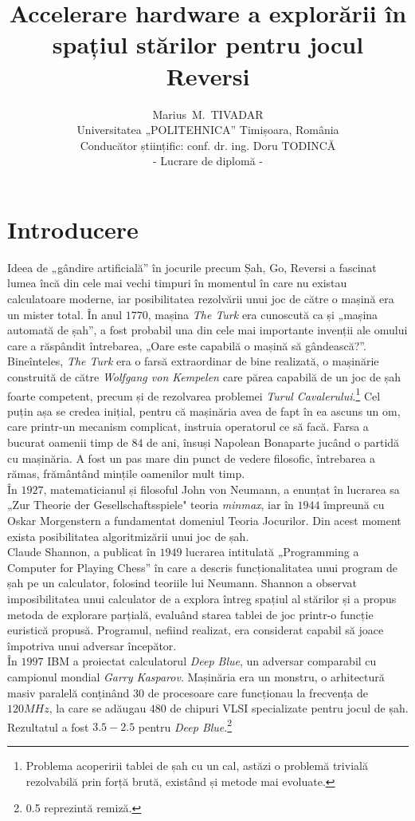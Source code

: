 \documentclass[11pt,twocolumn,a4paper]{article}
\title{\huge{Accelerare hardware a explorării în spațiul stărilor pentru jocul Reversi}}
\author{
Marius~M.~TIVADAR\\
Universitatea „POLITEHNICA” Timișoara, România\\
Conducător științific: conf. dr. ing. Doru TODINCĂ\\
- Lucrare de diplomă -
}
\begin{document}
\renewcommand{\today}{5 iunie 2009}
\maketitle

\section*{Introducere}
Ideea de „gândire artificială” în jocurile precum Șah, Go, Reversi a fascinat lumea încă din cele mai vechi timpuri în momentul în care nu existau calculatoare moderne, iar posibilitatea rezolvării unui joc de către o mașină era un mister total. În anul $1770$, mașina \emph{The Turk} era cunoscută ca și „mașina automată de șah”, a fost probabil una din cele mai importante invenții ale omului care a răspândit întrebarea, „Oare este capabilă o mașină să gândească?”. Bineînteles, \emph{The Turk} era o farsă extraordinar de bine realizată, o mașinărie construită de către \emph{Wolfgang von Kempelen} care părea capabilă de un joc de șah foarte competent, precum și de rezolvarea problemei \emph{Turul Cavalerului}.\footnote{Problema acoperirii tablei de șah cu un cal, astăzi o problemă trivială rezolvabilă prin forță brută, existând și metode mai evoluate.} Cel puțin așa se credea inițial, pentru că mașinăria avea de fapt în ea ascuns un om, care printr-un mecanism complicat, instruia operatorul ce să facă. Farsa a bucurat oamenii timp de $84$ de ani, însuși Napolean Bonaparte jucând o partidă cu mașinăria. A fost un pas mare din punct de vedere filosofic, întrebarea a rămas, frământând mințile oamenilor mult timp.\\
În $1927$, matematicianul și filosoful John von Neumann, a enunțat în lucrarea sa „Zur Theorie der Gesellschaftsspiele" teoria \emph{minmax}, iar în $1944$ împreună cu Oskar Morgenstern a fundamentat domeniul Teoria Jocurilor. Din acest moment exista posibilitatea algoritmizării unui joc de șah.\cite{Shoham}\cite{Allis}\\
Claude Shannon, a publicat în $1949$ lucrarea intitulată „Programming a Computer for Playing Chess” în care a descris funcționalitatea unui program de șah pe un calculator, folosind teoriile lui Neumann. Shannon a observat imposibilitatea unui calculator de a explora întreg spațiul al stărilor și a propus metoda de explorare parțială, evaluând starea tablei de joc printr-o funcție euristică propusă. Programul, nefiind realizat, era considerat capabil să joace împotriva unui adversar începător.\cite{Shannon}\\
În $1997$ IBM a proiectat calculatorul \emph{Deep Blue}, un adversar comparabil cu campionul mondial \emph{Garry Kasparov}. Mașinăria era un monstru, o arhitectură masiv paralelă conținând $30$ de procesoare care funcționau la frecvența de $120MHz$, la care se adăugau $480$ de chipuri VLSI specializate pentru jocul de șah. Rezultatul a fost $3.5 - 2.5$ pentru \emph{Deep Blue}.\footnote{0.5 reprezintă remiză.}\\
\end{document}
